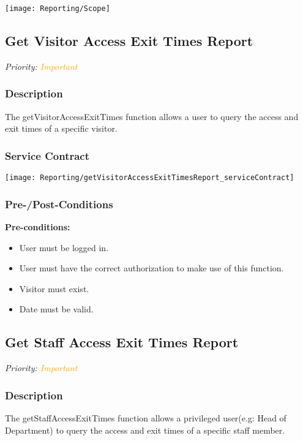 \texttt{[image: Reporting/Scope]}
\subsection{Get Visitor Access Exit Times Report}
\textit{Priority: \textcolor{orange}{Important}}

\subsubsection{Description}
The getVisitorAccessExitTimes function allows a user to query the access and exit times of a specific visitor.

		
\subsubsection{Service Contract}
\texttt{[image: Reporting/getVisitorAccessExitTimesReport\_serviceContract]}
\subsubsection{Pre-/Post-Conditions}
	\textbf{Pre-conditions:}
	\begin{itemize}
		\item User must be logged in.
		\item User must have the correct authorization to make use of this function.
		\item Visitor must exist.
		\item Date must be valid.
	\end{itemize}

\subsection{Get Staff Access Exit Times Report}
\textit{Priority: \textcolor{orange}{Important}}

\subsubsection{Description}
The getStaffAccessExitTimes function allows a privileged user(e.g: Head of Department) to query the access and exit times of a specific staff member.


